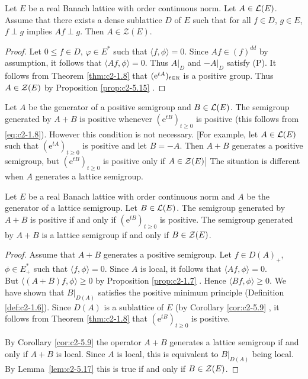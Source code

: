 \begin{lemma}\label{lem:c2-5.17}
Let $E$ be a real Banach lattice with order continuous norm.
Let $A \in \mathcal{L}(E)$.
Assume that there exists a dense sublattice $D$ of $E$ such that for all $f \in D$, $g \in E$, $f \perp g$ implies $Af \perp g$.
Then $A \in \mathcal{Z}(E)$.
\end{lemma}

\begin{proof}
Let $0 \leq f \in D$, $\varphi \in E^*$ such that $\langle f,\phi \rangle = 0$.
Since $Af \in (f)^{dd}$ by assumption, it follows that $\langle Af,\phi \rangle = 0$.
Thus $A|_D$ and $-A|_D$ satisfy (P).
It follows from Theorem \ref{thm:c2-1.8}    that $(\mathrm{e}^{tA})_{t \in \mathbb{R}}$ is a positive group.
Thus $A \in \mathcal{Z}(E)$ by  Proposition \ref{prop:c2-5.15}  .
\end{proof}

Let $A$ be the generator of a positive semigroup and $B \in \mathcal{L}(E)$. 
The semigroup generated by $A + B$ is positive whenever $(\mathrm{e}^{tB})_{t \geq 0}$ is positive (this follows from \ref{eq:c2-1.8}).
However this condition is not
necessary. [For example, let $A \in \mathcal{L}(E)$ such that $(\mathrm{e}^{tA})_{t \geq 0}$ is positive and let $B = -A$.
Then $A + B$ generates a positive semigroup, but $(\mathrm{e}^{tB})_{t \geq 0}$ is positive only if $A \in \mathcal{Z}(E)$]
The situation is different when $A$ generates a lattice semigroup.

\begin{theorem}\label{thm:c2-5.18}
Let $E$ be a real Banach lattice with order continuous norm and $A$ be the generator of a lattice semigroup.
Let $B \in \mathcal{L}(E)$.
The semigroup generated by $A + B$ is positive if and only if $(\mathrm{e}^{tB})_{t \geq 0}$ is positive.
The semigroup generated by $A + B$ is a lattice semigroup if and only if $B \in \mathcal{Z}(E)$.
\end{theorem}

\begin{proof}
Assume that $A + B$ generates a positive semigroup.
Let $f \in D(A)_{+}$, $\phi \in E_{+}^*$ such that $\langle f,\phi \rangle = 0$.
Since $A$ is local, it follows that $\langle Af,\phi \rangle = 0$.\\
But $\langle (A+B)f,\phi \rangle \geq 0$ by  Proposition  \ref{prop:c2-1.7}  .
Hence $\langle Bf,\phi \rangle \geq 0$.
We have shown that $B|_{D(A)}$ satisfies the positive minimum principle (Definition \ref{def:c2-1.6}).
Since $D(A)$ is a sublattice of $E$ (by Corollary \ref{cor:c2-5.9}  , it follows from Theorem \ref{thm:c2-1.8}   that $(\mathrm{e}^{tB})_{t \geq 0}$ is positive.

By Corollary \ref{cor:c2-5.9} the operator $A + B$ generates a lattice semigroup if and only if $A + B$ is local.
Since $A$ is local, this is equivalent to $B|_{D(A)}$ being local.
By Lemma~\ref{lem:c2-5.17} this is true if and only if $B \in \mathcal{Z}(E)$.
\end{proof}

